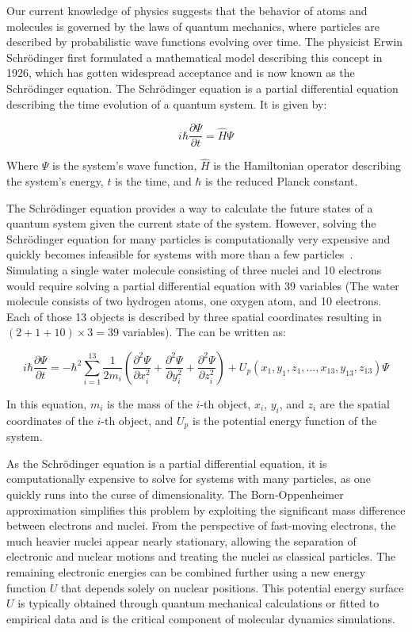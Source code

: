 Our current knowledge of physics suggests that the behavior of atoms and molecules is governed by the laws of quantum mechanics, where particles are described by probabilistic wave functions evolving over time. The physicist Erwin Schrödinger first formulated a mathematical model describing this concept in 1926, which has gotten widespread acceptance and is now known as the Schrödinger equation. The Schrödinger equation is a partial differential equation describing the time evolution of a quantum system. It is given by:

\begin{equation}
      i \hbar \frac{\partial \Psi}{\partial t} = \hat{H} \Psi
\end{equation}

Where $\Psi$ is the system's wave function, $\hat{H}$ is the Hamiltonian operator describing the system's energy, $t$ is the time, and $\hbar$ is the reduced Planck constant.
\smallskip

The Schrödinger equation provides a way to calculate the future states of a quantum system given the current state of the system. However, solving the Schrödinger equation for many particles is computationally very expensive and quickly becomes infeasible for systems with more than a few particles~\cite{Leimkuhler2015}. Simulating a single water molecule consisting of three nuclei and 10 electrons would require solving a partial differential equation with 39 variables (The water molecule consists of two hydrogen atoms, one oxygen atom, and 10 electrons. Each of those 13 objects is described by three spatial coordinates resulting in $(2+1+10)\times 3 = 39$ variables). The can be written as:

\begin{equation}
      i \hbar \frac{\partial \Psi}{\partial t} = -\hbar^2 \sum_{i=1}^{13} \frac{1}{2m_i} \left( \frac{\partial^2 \Psi}{\partial x_i^2} + \frac{\partial^2 \Psi}{\partial y_i^2} + \frac{\partial^2 \Psi}{\partial z_i^2} \right) + U_p (x_1, y_1, z_1, \ldots, x_{13}, y_{13}, z_{13}) \Psi
\end{equation}

In this equation, $m_i$ is the mass of the $i$-th object, $x_i$, $y_i$, and $z_i$ are the spatial coordinates of the $i$-th object, and $U_p$ is the potential energy function of the system.
\smallskip

As the Schrödinger equation is a partial differential equation, it is computationally expensive to solve for systems with many particles, as one quickly runs into the curse of dimensionality. The Born-Oppenheimer approximation simplifies this problem by exploiting the significant mass difference between electrons and nuclei. From the perspective of fast-moving electrons, the much heavier nuclei appear nearly stationary, allowing the separation of electronic and nuclear motions and treating the nuclei as classical particles. The remaining electronic energies can be combined further using a new energy function $U$ that depends solely on nuclear positions.
This potential energy surface $U$ is typically obtained through quantum mechanical calculations or fitted to empirical data and is the critical component of molecular dynamics simulations.

